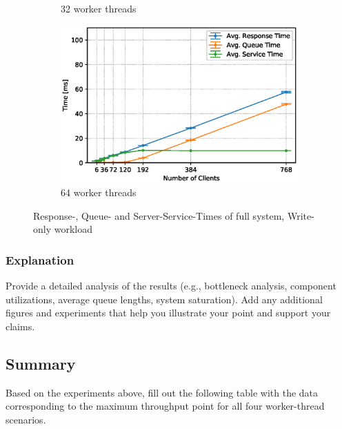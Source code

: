 \documentclass[11pt,a4paper]{article}
\begin{document}
\begin{figure}
\begin{subfigure}{.5\textwidth}
        \caption{32 worker threads}
    \end{subfigure}
    \begin{subfigure}{.5\textwidth}
        \includegraphics[width=1\linewidth]{plots/4b_extendedLatencyMiddleware_64w.eps}
        \caption{64 worker threads}
    \end{subfigure}

    \caption{Response-, Queue- and Server-Service-Times of full system, Write-only workload}
    \label{fig:4-times}
\end{figure}
\subsubsection{Explanation}

Provide a detailed analysis of the results (e.g., bottleneck analysis, component utilizations, average queue lengths, system saturation). Add any additional figures and experiments that help you illustrate your point and support your claims.

\subsection{Summary}

Based on the experiments above, fill out the following table with the data corresponding to the maximum throughput point for all four worker-thread scenarios.
\end{document}

